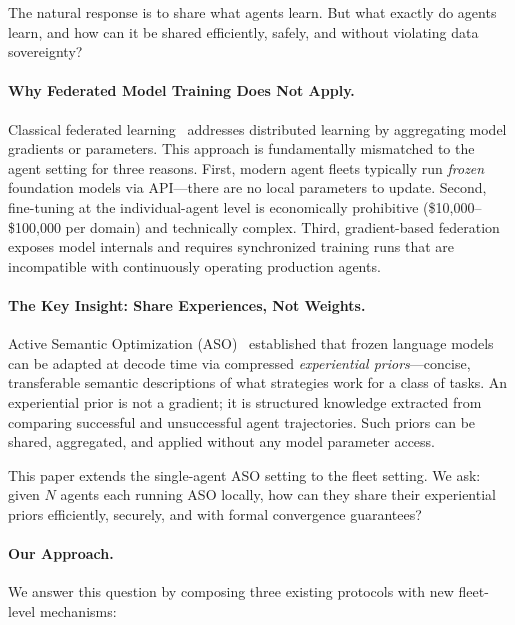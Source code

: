 \documentclass[11pt]{article}
\begin{document}
The natural response is to share what agents learn. But what exactly do agents
learn, and how can it be shared efficiently, safely, and without violating data
sovereignty?

\paragraph{Why Federated Model Training Does Not Apply.}
Classical federated learning~\cite{mcmahan2017communication} addresses
distributed learning by aggregating model gradients or parameters. This
approach is fundamentally mismatched to the agent setting for three reasons.
First, modern agent fleets typically run \emph{frozen} foundation models via
API---there are no local parameters to update. Second, fine-tuning at the
individual-agent level is economically prohibitive (\$10{,}000--\$100{,}000 per
domain) and technically complex. Third, gradient-based federation exposes model
internals and requires synchronized training runs that are incompatible with
continuously operating production agents.

\paragraph{The Key Insight: Share Experiences, Not Weights.}
Active Semantic Optimization (ASO)~\cite{hanzo2026aso} established that
frozen language models can be adapted at decode time via compressed
\emph{experiential priors}---concise, transferable semantic descriptions of
what strategies work for a class of tasks. An experiential prior is not a
gradient; it is structured knowledge extracted from comparing successful and
unsuccessful agent trajectories. Such priors can be shared, aggregated, and
applied without any model parameter access.

This paper extends the single-agent ASO setting to the fleet setting.
We ask: given $N$ agents each running ASO locally, how can they share their
experiential priors efficiently, securely, and with formal convergence
guarantees?

\paragraph{Our Approach.}
We answer this question by composing three existing protocols with new
fleet-level mechanisms:
\end{document}
